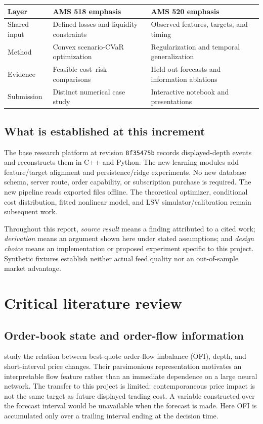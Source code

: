 \par\medskip
\begin{tabularx}{\textwidth}{@{}p{24mm}YY@{}}
\toprule
Layer & AMS 518 emphasis & AMS 520 emphasis\\\midrule
Shared input & Defined losses and liquidity constraints & Observed features, targets, and timing\\
Method & Convex scenario-CVaR optimization & Regularization and temporal generalization\\
Evidence & Feasible cost--risk comparisons & Held-out forecasts and information ablations\\
Submission & Distinct numerical case study & Interactive notebook and presentations\\\bottomrule
\end{tabularx}
\par\medskip

\subsection{What is established at this increment}
The base research platform at revision \texttt{8f35475b} records displayed-depth events and reconstructs them in C++ and Python. The new learning modules add feature/target alignment and persistence/ridge experiments. No new database schema, server route, order capability, or subscription purchase is required. The new pipeline reads exported files offline. The theoretical optimizer, conditional cost distribution, fitted nonlinear model, and LSV simulator/calibration remain subsequent work.

Throughout this report, \emph{source result} means a finding attributed to a cited work; \emph{derivation} means an argument shown here under stated assumptions; and \emph{design choice} means an implementation or proposed experiment specific to this project. Synthetic fixtures establish neither actual feed quality nor an out-of-sample market advantage.

\section{Critical literature review}
\subsection{Order-book state and order-flow information}
\citet{cont2014} study the relation between best-quote order-flow imbalance (OFI), depth, and short-interval price changes. Their parsimonious representation motivates an interpretable flow feature rather than an immediate dependence on a large neural network. The transfer to this project is limited: contemporaneous price impact is not the same target as future displayed trading cost. A variable constructed over the forecast interval would be unavailable when the forecast is made. Here OFI is accumulated only over a trailing interval ending at the decision time.

